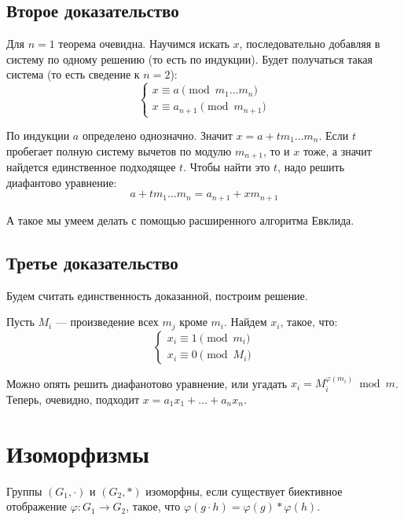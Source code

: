 \subsection{Второе доказательство}

Для \( n = 1 \) теорема очевидна.
Научимся искать \( x \), последовательно добавляя в систему по одному решению (то есть по индукции).
Будет получаться такая система (то есть сведение к \( n = 2 \)):
\[
    \begin{cases}
        x \equiv a \pmod {m_1 \ldots m_n}
        \\
        x \equiv a_{n + 1} \pmod {m_{n + 1}}
    \end{cases}
\]

По индукции \( a \) определено однозначно.
Значит \( x = a + t m_1 \ldots m_n \).
Если \( t \) пробегает полную систему вычетов по модулю \( m_{n + 1} \),
то и \( x \) тоже, а значит найдется единственное подходящее \( t \).
Чтобы найти это \( t \), надо решить диафантово уравнение:
\[
    a + t m_1 \ldots m_n = a_{n + 1} + x m_{n + 1}
\]

А такое мы умеем делать с помощью расширенного алгоритма Евклида.

\subsection{Третье доказательство}

Будем считать единственность доказанной, построим решение.

Пусть \( M_i \) --- произведение всех \( m_j \) кроме \( m_i \).
Найдем \( x_i \), такое, что:
\[
    \begin{cases}
        x_i \equiv 1 \pmod {m_i}
        \\
        x_i \equiv 0 \pmod {M_i}
    \end{cases}
\]

Можно опять решить диафанотово уравнение, или угадать \( x_i = M_i^{\varphi(m_i)} \bmod m \).
Теперь, очевидно, подходит \( x = a_1 x_1 + \ldots + a_n x_n \).

\newpage

\section{Изоморфизмы}

\begin{defn}{}{}
    Группы \( (G_1, \cdot) \) и \( (G_2, *) \) изоморфны,
    если существует биективное отображение \( \varphi : G_1 \to G_2 \),
    такое, что \( \varphi(g \cdot h) = \varphi(g) * \varphi(h) \).
\end{defn}

